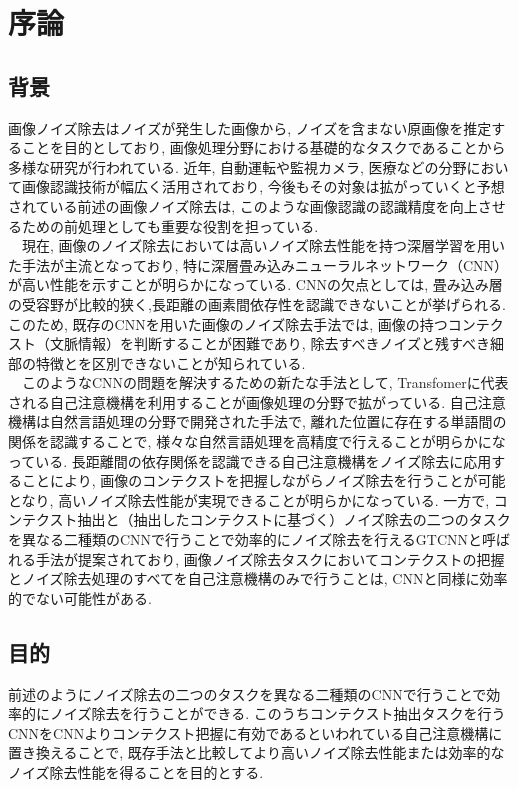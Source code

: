 \chapter{序論}
\section{背景}
画像ノイズ除去はノイズが発生した画像から, ノイズを含まない原画像を推定することを目的としており, 画像処理分野における基礎的なタスクであることから多様な研究が行われている. 
近年, 自動運転や監視カメラ, 医療などの分野において画像認識技術が幅広く活用されており, 今後もその対象は拡がっていくと予想されている前述の画像ノイズ除去は, このような画像認識の認識精度を向上させるための前処理としても重要な役割を担っている.\\
　現在, 画像のノイズ除去においては高いノイズ除去性能を持つ深層学習を用いた手法が主流となっており, 特に深層畳み込みニューラルネットワーク（CNN）が高い性能を示すことが明らかになっている. CNNの欠点としては, 畳み込み層の受容野が比較的狭く,長距離の画素間依存性を認識できないことが挙げられる. このため, 既存のCNNを用いた画像のノイズ除去手法では, 画像の持つコンテクスト（文脈情報）を判断することが困難であり, 除去すべきノイズと残すべき細部の特徴とを区別できないことが知られている.\\
　このようなCNNの問題を解決するための新たな手法として, Transfomer\cite{SA}に代表される自己注意機構を利用することが画像処理の分野で拡がっている\cite{ViT,Swin}. 自己注意機構は自然言語処理の分野で開発された手法で, 離れた位置に存在する単語間の関係を認識することで, 様々な自然言語処理を高精度で行えることが明らかになっている. 長距離間の依存関係を認識できる自己注意機構をノイズ除去に応用することにより, 画像のコンテクストを把握しながらノイズ除去を行うことが可能となり, 高いノイズ除去性能が実現できることが明らかになっている\cite{Swin,Restormer}. 一方で, コンテクスト抽出と（抽出したコンテクストに基づく）ノイズ除去の二つのタスクを異なる二種類のCNNで行うことで効率的にノイズ除去を行えるGTCNNと呼ばれる手法が提案されており\cite{GTCNN}, 画像ノイズ除去タスクにおいてコンテクストの把握とノイズ除去処理のすべてを自己注意機構のみで行うことは, CNNと同様に効率的でない可能性がある.

\section{目的}
前述のようにノイズ除去の二つのタスクを異なる二種類のCNNで行うことで効率的にノイズ除去を行うことができる. このうちコンテクスト抽出タスクを行うCNNをCNNよりコンテクスト把握に有効であるといわれている自己注意機構に置き換えることで, 既存手法と比較してより高いノイズ除去性能または効率的なノイズ除去性能を得ることを目的とする.